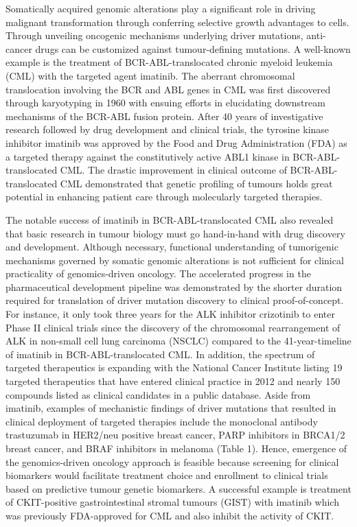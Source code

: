 Somatically acquired genomic alterations play a significant role in driving malignant transformation through conferring selective growth advantages to cells. Through unveiling oncogenic mechanisms underlying driver mutations, anti-cancer drugs can be customized against tumour-defining mutations. A well-known example is the treatment of BCR-ABL-translocated chronic myeloid leukemia (CML) with the targeted agent imatinib. The aberrant chromosomal translocation involving the BCR and ABL genes in CML was first discovered through karyotyping in 1960 with ensuing efforts in elucidating downstream mechanisms of the BCR-ABL fusion protein. After 40 years of investigative research followed by drug development and clinical trials, the tyrosine kinase inhibitor imatinib was approved by the Food and Drug Administration (FDA) as a targeted therapy against the constitutively active ABL1 kinase in BCR-ABL-translocated CML. The drastic improvement in clinical outcome of BCR-ABL-translocated CML demonstrated that genetic profiling of tumours holds great potential in enhancing patient care through molecularly targeted therapies.

The notable success of imatinib in BCR-ABL-translocated CML also revealed that basic research in tumour biology must go hand-in-hand with drug discovery and development. Although necessary, functional understanding of tumorigenic mechanisms governed by somatic genomic alterations is not sufficient for clinical practicality of genomics-driven oncology. The accelerated progress in the pharmaceutical development pipeline was demonstrated by the shorter duration required for translation of driver mutation discovery to clinical proof-of-concept. For instance, it only took three years for the ALK inhibitor crizotinib to enter Phase II clinical trials since the discovery of the chromosomal rearrangement of ALK in non-small cell lung carcinoma (NSCLC) compared to the 41-year-timeline of imatinib in BCR-ABL-translocated CML. In addition, the spectrum of targeted therapeutics is expanding with the National Cancer Institute listing 19 targeted therapeutics that have entered clinical practice in 2012 and nearly 150 compounds listed as clinical candidates in a public database. Aside from imatinib, examples of mechanistic findings of driver mutations that resulted in clinical deployment of targeted therapies include the monoclonal antibody trastuzumab in HER2/neu positive breast cancer, PARP inhibitors in BRCA1/2 breast cancer, and BRAF inhibitors in melanoma (Table 1). Hence, emergence of the genomics-driven oncology approach is feasible because screening for clinical biomarkers would facilitate treatment choice and enrollment to clinical trials based on predictive tumour genetic biomarkers. A successful example is treatment of CKIT-positive gastrointestinal stromal tumours (GIST) with imatinib which was previously FDA-approved for CML and also inhibit the activity of CKIT.

